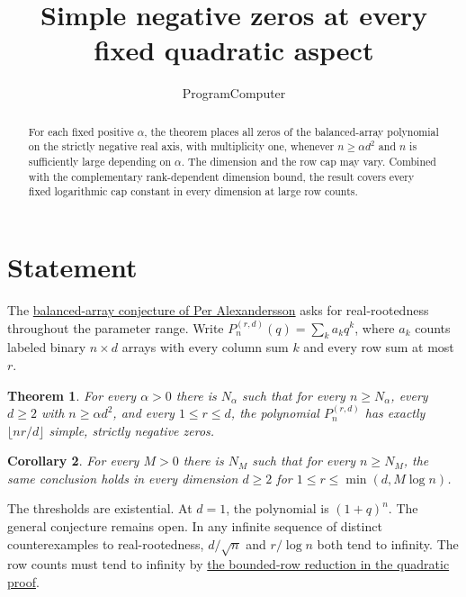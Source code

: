 \documentclass[11pt]{article}
\title{Simple negative zeros at every fixed quadratic aspect}
\author{ProgramComputer}
\date{}
\newtheorem{theorem}{Theorem}
\newtheorem{corollary}[theorem]{Corollary}
\begin{document}
\maketitle

\begin{abstract}
For each fixed positive $\alpha$, the theorem places all zeros
of the balanced-array polynomial on the strictly negative real axis,
with multiplicity one, whenever $n\ge\alpha d^2$ and $n$ is sufficiently
large depending on $\alpha$. The dimension and the row cap may vary.
Combined with the complementary rank-dependent dimension bound, the
result covers every fixed logarithmic cap constant in every dimension
at large row counts.
\end{abstract}

\section{Statement}
The \href{https://www.symmetricfunctions.com/realRootedOpenProblems.htm\#conjBalancedArrays}{balanced-array conjecture of Per Alexandersson}
asks for real-rootedness throughout the parameter range. Write
$P_n^{(r,d)}(q)=\sum_k a_kq^k$, where $a_k$ counts labeled binary
$n\times d$ arrays with every column sum $k$ and every row sum at most $r$.

\begin{theorem}
For every $\alpha>0$ there is $N_\alpha$ such that for every $n\ge N_\alpha$,
every $d\ge2$ with $n\ge\alpha d^2$, and every $1\le r\le d$, the polynomial
$P_n^{(r,d)}$ has exactly $\lfloor nr/d\rfloor$ simple, strictly negative zeros.
\end{theorem}
\begin{corollary}
For every $M>0$ there is $N_M$ such that for every $n\ge N_M$, the same
conclusion holds in every dimension $d\ge2$ for $1\le r\le\min(d,M\log n)$.
\end{corollary}
The thresholds are existential. At $d=1$, the polynomial is $(1+q)^n$.
The general conjecture remains open. In any infinite sequence of distinct
counterexamples to real-rootedness, $d/\sqrt n$ and $r/\log n$ both tend to
infinity. The row counts must tend to infinity by
\href{https://github.com/ProgramComputer/open-math-research/blob/4fb624ba937a8eecc1361a6066185cd81ab7b172/topics/balanced-arrays/quadratic/proof.md}{the bounded-row reduction in the quadratic proof}.



\appendix
\clearpage



\end{document}
